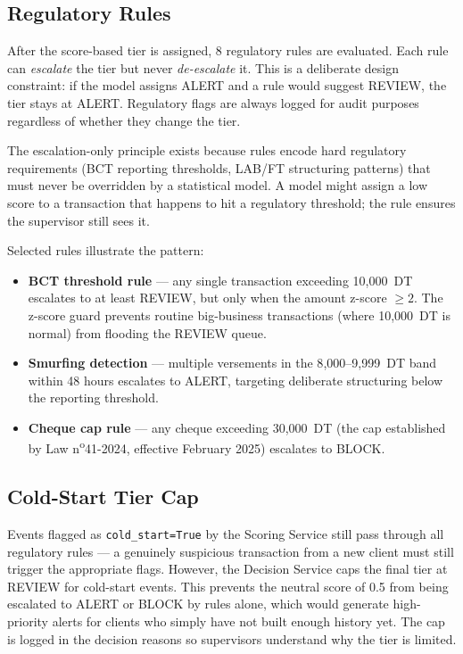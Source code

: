 \subsection{Regulatory Rules}

After the score-based tier is assigned, 8 regulatory rules are evaluated. Each
rule can \emph{escalate} the tier but never \emph{de-escalate} it. This is a
deliberate design constraint: if the model assigns ALERT and a rule would
suggest REVIEW, the tier stays at ALERT. Regulatory flags are always logged
for audit purposes regardless of whether they change the tier.

The escalation-only principle exists because rules encode hard regulatory
requirements (BCT reporting thresholds, LAB/FT structuring patterns) that
must never be overridden by a statistical model. A model might assign a low
score to a transaction that happens to hit a regulatory threshold; the rule
ensures the supervisor still sees it.

Selected rules illustrate the pattern:

\begin{itemize}
    \item \textbf{BCT threshold rule} --- any single transaction exceeding
          10{,}000~DT escalates to at least REVIEW, but only when the amount
          z-score $\geq 2$. The z-score guard prevents routine big-business
          transactions (where 10{,}000~DT is normal) from flooding the
          REVIEW queue.
    \item \textbf{Smurfing detection} --- multiple versements in the
          8{,}000--9{,}999~DT band within 48 hours escalates to ALERT,
          targeting deliberate structuring below the reporting threshold.
    \item \textbf{Cheque cap rule} --- any cheque exceeding 30{,}000~DT
          (the cap established by Law n\textsuperscript{o}41-2024, effective
          February 2025) escalates to BLOCK.
\end{itemize}

\subsection{Cold-Start Tier Cap}

Events flagged as \texttt{cold\_start=True} by the Scoring Service still pass
through all regulatory rules --- a genuinely suspicious transaction from a new
client must still trigger the appropriate flags. However, the Decision Service
caps the final tier at REVIEW for cold-start events. This prevents the neutral
score of 0.5 from being escalated to ALERT or BLOCK by rules alone, which would
generate high-priority alerts for clients who simply have not built enough
history yet. The cap is logged in the decision reasons so supervisors understand
why the tier is limited.

